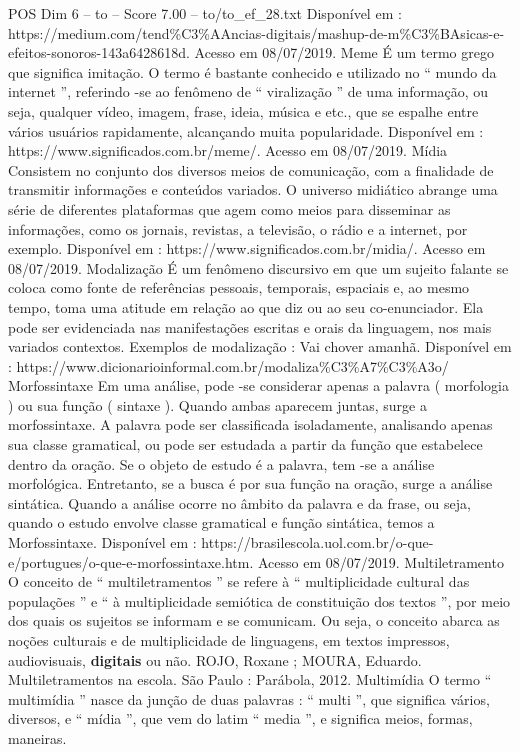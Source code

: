 \begin{textsample}{POS Dim 6 – to – Score 7.00 – to/to\_ef\_28.txt}
Disponível em : https://medium.com/tend\%C3\%AAncias-digitais/mashup-de-m\%C3\%BAsicas-e-efeitos-sonoros-143a6428618d.
Acesso em 08/07/2019.
Meme É um termo grego que significa imitação.
O termo é bastante conhecido e utilizado no “ mundo da internet ”, referindo -se ao fenômeno de “ viralização ” de uma informação, ou seja, qualquer vídeo, imagem, frase, ideia, música e etc., que se espalhe entre vários usuários rapidamente, alcançando muita popularidade.
Disponível em : https://www.significados.com.br/meme/.
Acesso em 08/07/2019.
Mídia Consistem no conjunto dos diversos meios de comunicação, com a finalidade de transmitir informações e conteúdos variados.
O universo midiático abrange uma série de diferentes plataformas que agem como meios para disseminar as informações, como os jornais, revistas, a televisão, o rádio e a internet, por exemplo.
Disponível em : https://www.significados.com.br/midia/.
Acesso em 08/07/2019.
Modalização É um fenômeno discursivo em que um sujeito falante se coloca como fonte de referências pessoais, temporais, espaciais e, ao mesmo tempo, toma uma atitude em relação ao que diz ou ao seu co-enunciador.
Ela pode ser evidenciada nas manifestações escritas e orais da linguagem, nos mais variados contextos.
Exemplos de modalização : Vai chover amanhã.
Disponível em : https://www.dicionarioinformal.com.br/modaliza\%C3\%A7\%C3\%A3o/ Morfossintaxe Em uma análise, pode -se considerar apenas a palavra ( morfologia ) ou sua função ( sintaxe ).
Quando ambas aparecem juntas, surge a morfossintaxe.
A palavra pode ser classificada isoladamente, analisando apenas sua classe gramatical, ou pode ser estudada a partir da função que estabelece dentro da oração.
Se o objeto de estudo é a palavra, tem -se a análise morfológica.
Entretanto, se a busca é por sua função na oração, surge a análise sintática.
Quando a análise ocorre no âmbito da palavra e da frase, ou seja, quando o estudo envolve classe gramatical e função sintática, temos a Morfossintaxe.
Disponível em : https://brasilescola.uol.com.br/o-que-e/portugues/o-que-e-morfossintaxe.htm.
Acesso em 08/07/2019.
Multiletramento O conceito de “ multiletramentos ” se refere à “ multiplicidade cultural das populações ” e “ à multiplicidade semiótica de constituição dos textos ”, por meio dos quais os sujeitos se informam e se comunicam.
Ou seja, o conceito abarca as noções culturais e de multiplicidade de linguagens, em textos impressos, audiovisuais, \textbf{digitais} ou não.
ROJO, Roxane ; MOURA, Eduardo.
Multiletramentos na escola.
São Paulo : Parábola, 2012.
Multimídia O termo “ multimídia ” nasce da junção de duas palavras : “ multi ”, que significa vários, diversos, e “ mídia ”, que vem do latim “ media ”, e significa meios, formas, maneiras.

\end{textsample}
